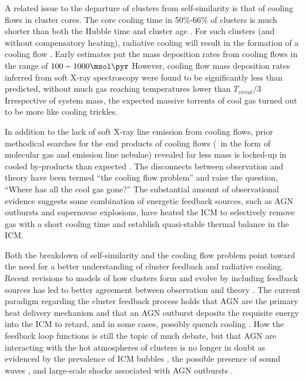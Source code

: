 A related issue to the departure of clusters from self-similarity is
that of cooling flows in cluster cores. The core cooling time in
50\%-66\% of clusters is much shorter than both the Hubble time and
cluster age \citep{1984ApJ...285....1S, 1992MNRAS.258..177E, white97,
  1998MNRAS.298..416P, 2005MNRAS.359.1481B}. For such clusters (and
without compensatory heating), radiative cooling will result in the
formation of a cooling flow \citep[see][for a
  review]{fabiancfreview}. Early estimates put the mass deposition
rates from cooling flows in the range of $100-1000 \msol \pyr$
\citep[\eg][]{1984ApJ...276...38J, 1994MNRAS.270L...1E,
  1998MNRAS.298..416P} However, cooling flow mass deposition rates
inferred from soft X-ray spectroscopy were found to be significantly
less than predicted, without much gas reaching temperatures lower than
$T_{virial}/3$ \citep{tamura01, peterson01, peterson03,
  2004A&A...413..415K} Irrespective of system mass, the expected
massive torrents of cool gas turned out to be more like cooling
trickles.

In addition to the lack of soft X-ray line emission from cooling
flows, prior methodical searches for the end products of cooling flows
(\ie\ in the form of molecular gas and emission line nebulae) revealed
far less mass is locked-up in cooled by-products than expected
\citep{heckman89, mcnamara90, odea94, voit95}. The disconnects between
observation and theory have been termed ``the cooling flow problem''
and raise the question, ``Where has all the cool gas gone?'' The
substantial amount of observational evidence suggests some combination
of energetic feedback sources, such as AGN outbursts and supernovae
explosions, have heated the ICM to selectively remove gas with a short
cooling time and establish quasi-stable thermal balance in the ICM.

Both the breakdown of self-similarity and the cooling flow problem
point toward the need for a better understanding of cluster feedback
and radiative cooling. Recent revisions to models of how clusters form
and evolve by including feedback sources has led to better agreement
between observation and theory \citep{bower06, croton06, saro06,
  bower08}. The current paradigm regarding the cluster feedback
process holds that AGN are the primary heat delivery mechanism and
that an AGN outburst deposits the requisite energy into the ICM to
retard, and in some cases, possibly quench cooling \citep[see][for a
  review]{mcnamrev}. How the feedback loop functions is still the
topic of much debate, but that AGN are interacting with the hot
atmospheres of clusters is no longer in doubt as evidenced by the
prevalence of ICM bubbles \citep[\eg][]{birzan04,dunn08}, the possible
presence of sound waves \citep{2003MNRAS.344L..43F,
  2008MNRAS.390L..93S}, and large-scale shocks associated with AGN
outbursts \citep{2005ApJ...635..894F, ms0735, 2005ApJ...628..629N}.


